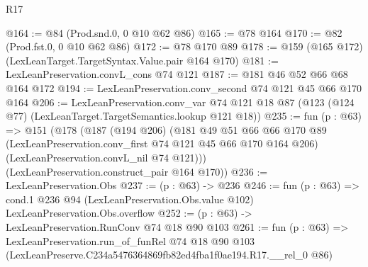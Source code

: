 \begin{lexlean}{R17}
\begin{coremodule}
@164 := @84 (Prod.snd.{0, 0} @10 @62 @86)
@165 := @78 @164
@170 := @82 (Prod.fst.{0, 0} @10 @62 @86)
@172 := @78 @170 @89
@178 := @159 (@165 @172) (LexLeanTarget.TargetSyntax.Value.pair @164 @170)
@181 := LexLeanPreservation.convL_cons @74 @121
@187 := @181 @46 @52 @66 @68 @164 @172
@194 := LexLeanPreservation.conv_second @74 @121 @45 @66 @170 @164
@206 := LexLeanPreservation.conv_var
    @74
    @121
    @18
    @87
    (@123 (@124 @77) (LexLeanTarget.TargetSemantics.lookup @121 @18))
@235 := fun (p : @63) =>
  @151
    (@178
      (@187
        (@194 @206)
        (@181
          @49
          @51
          @66
          @66
          @170
          @89
          (LexLeanPreservation.conv_first @74 @121 @45 @66 @170 @164 @206)
          (LexLeanPreservation.convL_nil @74 @121)))
      (LexLeanPreservation.construct_pair @164 @170))
@236 := LexLeanPreservation.Obs
@237 := (p : @63) -> @236
@246 := fun (p : @63) =>
  cond.{1} @236 @94 (LexLeanPreservation.Obs.value @102) LexLeanPreservation.Obs.overflow
@252 := (p : @63) -> LexLeanPreservation.RunConv @74 @18 @90 @103
@261 := fun (p : @63) =>
  LexLeanPreservation.run_of_funRel
    @74
    @18
    @90
    @103
    (LexLeanPreserve.C234a5476364869fb82ed4fba1f0ae194.R17.__rel_0 @86)
\end{coremodule}
\end{lexlean}
